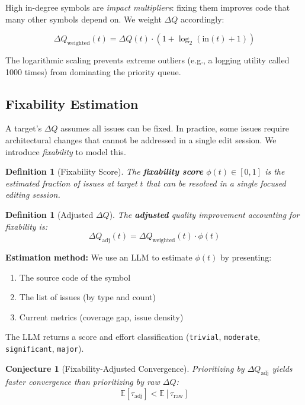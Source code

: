 \documentclass[11pt,a4paper]{article}
\newtheorem{definition}[theorem]{Definition}
\newtheorem{conjecture}[theorem]{Conjecture}
\begin{document}
High in-degree symbols are \emph{impact multipliers}: fixing them improves code that many other symbols depend on. We weight $\Delta Q$ accordingly:

\begin{equation}
\Delta Q_{\text{weighted}}(t) = \Delta Q(t) \cdot (1 + \log_2(\text{in}(t) + 1))
\label{eq:weighted-delta-q}
\end{equation}

The logarithmic scaling prevents extreme outliers (e.g., a logging utility called 1000 times) from dominating the priority queue.

\subsection{Fixability Estimation}
\label{sec:fixability}

A target's $\Delta Q$ assumes all issues can be fixed. In practice, some issues require architectural changes that cannot be addressed in a single edit session. We introduce \emph{fixability} to model this.

\begin{definition}[Fixability Score]
The \textbf{fixability score} $\phi(t) \in [0, 1]$ is the estimated fraction of issues at target $t$ that can be resolved in a single focused editing session.
\end{definition}

\begin{definition}[Adjusted $\Delta Q$]
The \textbf{adjusted} quality improvement accounting for fixability is:
\begin{equation}
\Delta Q_{\text{adj}}(t) = \Delta Q_{\text{weighted}}(t) \cdot \phi(t)
\label{eq:adjusted-delta-q}
\end{equation}
\end{definition}

\textbf{Estimation method:} We use an LLM to estimate $\phi(t)$ by presenting:
\begin{enumerate}
  \item The source code of the symbol
  \item The list of issues (by type and count)
  \item Current metrics (coverage gap, issue density)
\end{enumerate}

The LLM returns a score and effort classification (\texttt{trivial}, \texttt{moderate}, \texttt{significant}, \texttt{major}).

\begin{conjecture}[Fixability-Adjusted Convergence]
\label{conj:fixability}
Prioritizing by $\Delta Q_{\text{adj}}$ yields faster convergence than prioritizing by raw $\Delta Q$:
\[
\mathbb{E}[\tau_{\text{adj}}] < \mathbb{E}[\tau_{\text{raw}}]
\]
\end{conjecture}
\end{document}
